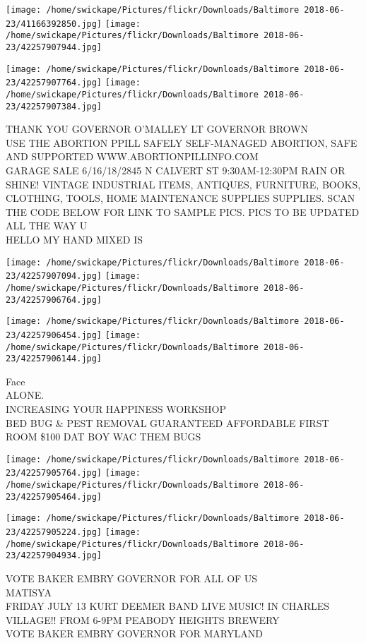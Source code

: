 \documentclass[10pt,letterpaper]{article}
\begin{document}
\texttt{[image: /home/swickape/Pictures/flickr/Downloads/Baltimore 2018-06-23/41166392850.jpg]}
\texttt{[image: /home/swickape/Pictures/flickr/Downloads/Baltimore 2018-06-23/42257907944.jpg]}

\texttt{[image: /home/swickape/Pictures/flickr/Downloads/Baltimore 2018-06-23/42257907764.jpg]}
\texttt{[image: /home/swickape/Pictures/flickr/Downloads/Baltimore 2018-06-23/42257907384.jpg]}

THANK YOU GOVERNOR O'MALLEY LT GOVERNOR BROWN\\
USE THE ABORTION PPILL SAFELY SELF{-}MANAGED ABORTION, SAFE AND SUPPORTED WWW.ABORTIONPILLINFO.COM\\
GARAGE SALE 6/16/18/2845 N CALVERT ST 9:30AM{-}12:30PM RAIN OR SHINE!  VINTAGE INDUSTRIAL ITEMS, ANTIQUES, FURNITURE, BOOKS, CLOTHING, TOOLS, HOME MAINTENANCE SUPPLIES SUPPLIES.  SCAN THE CODE BELOW FOR LINK TO SAMPLE PICS.  PICS TO BE UPDATED ALL THE WAY U\\
HELLO MY HAND MIXED IS\\
\pagebreak

\texttt{[image: /home/swickape/Pictures/flickr/Downloads/Baltimore 2018-06-23/42257907094.jpg]}
\texttt{[image: /home/swickape/Pictures/flickr/Downloads/Baltimore 2018-06-23/42257906764.jpg]}

\texttt{[image: /home/swickape/Pictures/flickr/Downloads/Baltimore 2018-06-23/42257906454.jpg]}
\texttt{[image: /home/swickape/Pictures/flickr/Downloads/Baltimore 2018-06-23/42257906144.jpg]}

Face\\
ALONE.\\
INCREASING YOUR HAPPINESS WORKSHOP\\
BED BUG \& PEST REMOVAL GUARANTEED AFFORDABLE FIRST ROOM \$100 DAT BOY WAC THEM BUGS\\
\pagebreak

\texttt{[image: /home/swickape/Pictures/flickr/Downloads/Baltimore 2018-06-23/42257905764.jpg]}
\texttt{[image: /home/swickape/Pictures/flickr/Downloads/Baltimore 2018-06-23/42257905464.jpg]}

\texttt{[image: /home/swickape/Pictures/flickr/Downloads/Baltimore 2018-06-23/42257905224.jpg]}
\texttt{[image: /home/swickape/Pictures/flickr/Downloads/Baltimore 2018-06-23/42257904934.jpg]}

VOTE BAKER EMBRY GOVERNOR FOR ALL OF US\\
MATISYA\\
FRIDAY JULY 13 KURT DEEMER BAND LIVE MUSIC!  IN CHARLES VILLAGE!!  FROM 6{-}9PM PEABODY HEIGHTS BREWERY\\
VOTE BAKER EMBRY GOVERNOR FOR MARYLAND\\
\pagebreak
\end{document}
